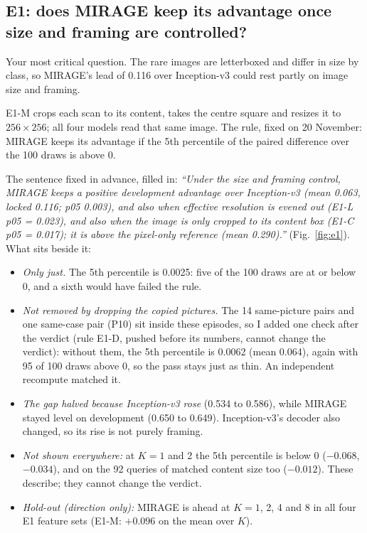 \documentclass[10pt,a4paper]{article}
\newenvironment{parts}{\begin{description}[style=unboxed, leftmargin=0pt, itemsep=3pt, font=\normalfont\bfseries\itshape]}{\end{description}}
\newenvironment{topic}[2]{\subsection{#1}\label{#2}\begin{parts}}{\end{parts}}
\begin{document}
\begin{topic}{E1: does MIRAGE keep its advantage once size and framing are controlled?}{sec:e1}
\item[The problem.] Your most critical question. The rare images are letterboxed and differ in size by class, so
MIRAGE's lead of 0.116 over Inception-v3 could rest partly on image size and framing.
\item[What I did.] E1-M crops each scan to its content, takes the centre square and resizes it to
$256\times256$; all four models read that same image. The rule, fixed on 20 November: MIRAGE keeps its advantage
if the 5th percentile of the paired difference over the 100 draws is above 0.
\item[Result.] The sentence fixed in advance, filled in: \emph{``Under the size and framing control, MIRAGE keeps a
positive development advantage over Inception-v3 (mean 0.063, locked 0.116; p05 0.003), and also when effective
resolution is evened out (E1-L p05 = 0.023), and also when the image is only cropped to its content box (E1-C p05 =
0.017); it is above the pixel-only reference (mean 0.290).''} (Fig.~\ref{fig:e1}). What sits beside it:
\begin{itemize}
  \item \emph{Only just.} The 5th percentile is 0.0025: five of the 100 draws are at or below 0, and a sixth would
        have failed the rule.
  \item \emph{Not removed by dropping the copied pictures.} The 14 same-picture pairs and one same-case pair (P10)
        sit inside these episodes, so I added one check after the verdict (rule E1-D, pushed before its numbers,
        cannot change the verdict): without them, the 5th percentile is 0.0062 (mean 0.064), again with 95 of
        100 draws above 0, so the pass stays just as thin. An independent recompute matched it.
  \item \emph{The gap halved because Inception-v3 rose} (0.534 to 0.586), while MIRAGE stayed level on
        development (0.650 to 0.649). Inception-v3's decoder also changed, so its rise is not purely framing.
  \item \emph{Not shown everywhere:} at $K=1$ and 2 the 5th percentile is below 0 ($-0.068$, $-0.034$), and on the
        92 queries of matched content size too ($-0.012$). These describe; they cannot change the verdict.
  \item \emph{Hold-out (direction only):} MIRAGE is ahead at $K=1$, 2, 4 and 8 in all four E1 feature sets (E1-M:
        $+0.096$ on the mean over $K$).

\end{itemize}
\end{topic}
\end{document}
